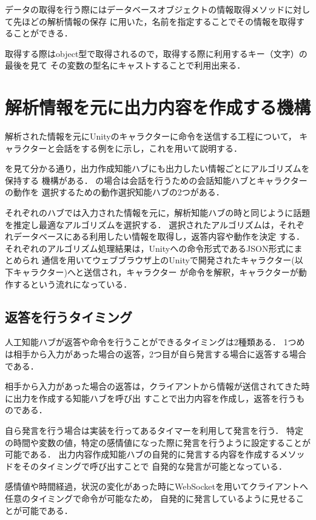 データの取得を行う際にはデータベースオブジェクトの情報取得メソッドに対して先ほどの解析情報の保存
に用いた，名前を指定することでその情報を取得することができる．

取得する際はobject型で取得されるので，取得する際に利用するキー（文字）の最後を見て
その変数の型名にキャストすることで利用出来る．


\section{解析情報を元に出力内容を作成する機構}
解析された情報を元にUnityのキャラクターに命令を送信する工程について，
キャラクターと会話をする例をに示し，これを用いて説明する．


を見て分かる通り，出力作成知能ハブにも出力したい情報ごとにアルゴリズムを保持する
機構がある．
の場合は会話を行うための会話知能ハブとキャラクターの動作を
選択するための動作選択知能ハブの2つがある．

それぞれのハブでは入力された情報を元に，解析知能ハブの時と同じように話題を推定し最適なアルゴリズムを選択する．
選択されたアルゴリズムは，それぞれデータベースにある利用したい情報を取得し，返答内容や動作を決定
する．
それぞれのアルゴリズム処理結果は，Unityへの命令形式であるJSON形式にまとめられ
通信を用いてウェブブラウザ上のUnityで開発されたキャラクター(以下キャラクター)へと送信され，キャラクター
が命令を解釈，キャラクターが動作するという流れになっている．

\subsection{返答を行うタイミング}
人工知能ハブが返答や命令を行うことができるタイミングは2種類ある．
1つめは相手から入力があった場合の返答，2つ目が自ら発言する場合に返答する場合である．

相手から入力があった場合の返答は，クライアントから情報が送信されてきた時に出力を作成する知能ハブを呼び出
すことで出力内容を作成し，返答を行うものである．

自ら発言を行う場合は実装を行ってあるタイマーを利用して発言を行う．
特定の時間や変数の値，特定の感情値になった際に発言を行うように設定することが可能である．
出力内容作成知能ハブの自発的に発言する内容を作成するメソッドをそのタイミングで呼び出すことで
自発的な発言が可能となっている．

感情値や時間経過，状況の変化があった時にWebSocketを用いてクライアントへ任意のタイミングで命令が可能なため，
自発的に発言しているように見せることが可能である．

